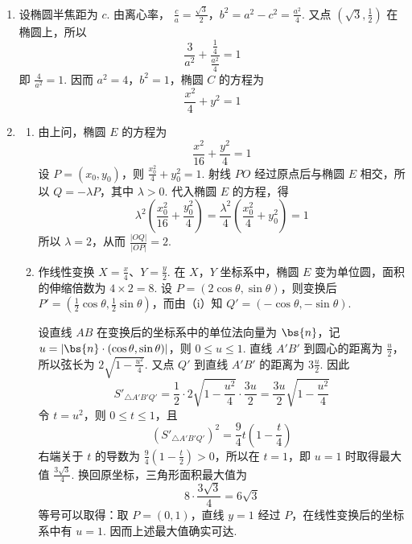 \begin{solution}
\begin{enumerate}
\item 设椭圆半焦距为 \(c\). 由离心率，
\(\frac ca=\frac{\sqrt3}{2}\)，\(b^2=a^2-c^2=\frac{a^2}{4}\).
又点 \(\left(\sqrt3,\frac12\right)\) 在椭圆上，所以
\[
\frac{3}{a^2}+\frac{\frac{1}{4}}{\frac{a^2}{4}}=1
\]
即 \(\frac4{a^2}=1\). 因而 \(a^2=4\)，\(b^2=1\)，椭圆 \(C\) 的方程为
\[
\frac{x^2}{4}+y^2=1
\]

\item
\begin{enumerate}
\item 由上问，椭圆 \(E\) 的方程为
\[
\frac{x^2}{16}+\frac{y^2}{4}=1
\]
设 \(P=(x_0,y_0)\)，则 \(\frac{x_0^2}{4}+y_0^2=1\). 射线 \(PO\) 经过原点后与椭圆 \(E\) 相交，所以 \(Q=-\lambda P\)，其中 \(\lambda>0\). 代入椭圆 \(E\) 的方程，得
\[
\lambda^2\left(\frac{x_0^2}{16}+\frac{y_0^2}{4}\right)
=\frac{\lambda^2}{4}\left(\frac{x_0^2}{4}+y_0^2\right)=1
\]
所以 \(\lambda=2\)，从而 \(\frac{|OQ|}{|OP|}=2\).

\item 作线性变换 \(X=\frac{x}{4}\)、\(Y=\frac{y}{2}\). 在 \(X\)，\(Y\) 坐标系中，椭圆 \(E\) 变为单位圆，面积的伸缩倍数为 \(4\times2=8\). 设 \(P=(2\cos\theta,\sin\theta)\)，则变换后
\(P'=\left(\frac12\cos\theta,\frac12\sin\theta\right)\)，而由（i）知 \(Q' =(-\cos\theta,-\sin\theta)\).

设直线 \(AB\) 在变换后的坐标系中的单位法向量为 \(\bs{n}\)，记 \(u=|\bs{n}\cdot(\cos\theta,\sin\theta)|\)，则 \(0\leqslant u\leqslant1\). 直线 \(A'B'\) 到圆心的距离为 \(\frac{u}{2}\)，所以弦长为 \(2\sqrt{1-\frac{u^2}{4}}\). 又点 \(Q'\) 到直线 \(A'B'\) 的距离为 \(3\frac{u}{2}\). 因此
\[
S'_{\triangle A'B'Q'}
=\frac12\cdot2\sqrt{1-\frac{u^2}{4}}\cdot\frac{3u}{2}
=\frac{3u}{2}\sqrt{1-\frac{u^2}{4}}
\]
令 \(t=u^2\)，则 \(0\leqslant t\leqslant1\)，且
\[
\left(S'_{\triangle A'B'Q'}\right)^2
=\frac94t\left(1-\frac t4\right)
\]
右端关于 \(t\) 的导数为 \(\frac94(1-\frac t2)>0\)，所以在 \(t=1\)，即 \(u=1\) 时取得最大值 \(\frac{3\sqrt3}{4}\). 换回原坐标，三角形面积最大值为
\[
8\cdot\frac{3\sqrt3}{4}=6\sqrt3
\]
等号可以取得：取 \(P=(0,1)\)，直线 \(y=1\) 经过 \(P\)，在线性变换后的坐标系中有 \(u=1\). 因而上述最大值确实可达.
\end{enumerate}
\end{enumerate}
\end{solution}
